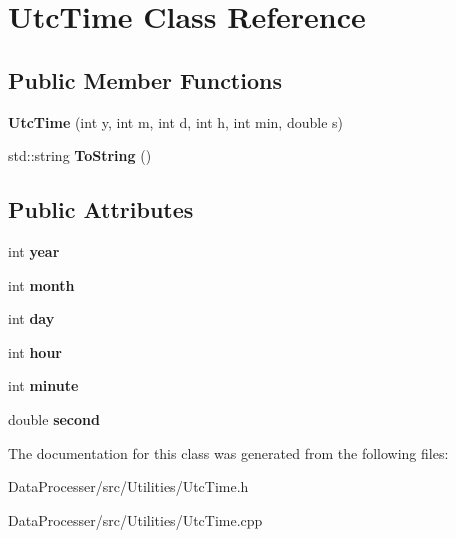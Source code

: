 \hypertarget{classUtcTime}{}\section{Utc\+Time Class Reference}
\label{classUtcTime}
\subsection*{Public Member Functions}
\begin{DoxyCompactItemize}
\item 
\mbox{\label{classUtcTime_a0c7adf939e9c0d25844d1901bdc75a31}} 
{\bfseries Utc\+Time} (int y, int m, int d, int h, int min, double s)
\item 
\mbox{\label{classUtcTime_a51213d81df592f14782853569c150e49}} 
std\+::string {\bfseries To\+String} ()
\end{DoxyCompactItemize}
\subsection*{Public Attributes}
\begin{DoxyCompactItemize}
\item 
\mbox{\label{classUtcTime_a8e69cfba3818d7fe34fdb688ee983d49}} 
int {\bfseries year}
\item 
\mbox{\label{classUtcTime_a2594e00e74b015f01eb45f539b1eb214}} 
int {\bfseries month}
\item 
\mbox{\label{classUtcTime_a6fa8ddb218225c2be962a29c1213037c}} 
int {\bfseries day}
\item 
\mbox{\label{classUtcTime_af940818b8bc15fa234b11e0f09ac6c19}} 
int {\bfseries hour}
\item 
\mbox{\label{classUtcTime_abd0eda4abd006d346ffeadc33a1d10fc}} 
int {\bfseries minute}
\item 
\mbox{\label{classUtcTime_aec1f76c5ce0c2787654713b2fd42c978}} 
double {\bfseries second}
\end{DoxyCompactItemize}


The documentation for this class was generated from the following files\+:\begin{DoxyCompactItemize}
\item 
Data\+Processer/src/\+Utilities/Utc\+Time.\+h\item 
Data\+Processer/src/\+Utilities/Utc\+Time.\+cpp\end{DoxyCompactItemize}
